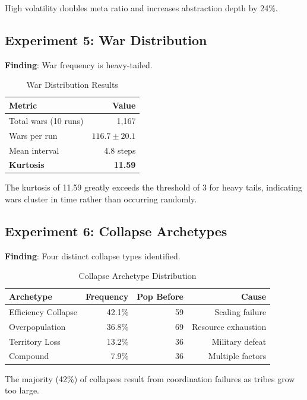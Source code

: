 \documentclass[11pt,a4paper]{article}
\begin{document}
High volatility doubles meta ratio and increases abstraction depth by 24\%.

\subsection{Experiment 5: War Distribution}

\textbf{Finding}: War frequency is heavy-tailed.

\begin{table}[htbp]
\centering
\caption{War Distribution Results}
\label{tab:wars}
\begin{tabular}{@{}lr@{}}
\toprule
Metric & Value \\
\midrule
Total wars (10 runs) & 1,167 \\
Wars per run & $116.7 \pm 20.1$ \\
Mean interval & 4.8 steps \\
\textbf{Kurtosis} & \textbf{11.59} \\
\bottomrule
\end{tabular}
\end{table}

The kurtosis of 11.59 greatly exceeds the threshold of 3 for heavy tails, indicating wars cluster in time rather than occurring randomly.

\subsection{Experiment 6: Collapse Archetypes}

\textbf{Finding}: Four distinct collapse types identified.

\begin{table}[htbp]
\centering
\caption{Collapse Archetype Distribution}
\label{tab:collapses}
\begin{tabular}{@{}lrrr@{}}
\toprule
Archetype & Frequency & Pop Before & Cause \\
\midrule
Efficiency Collapse & 42.1\% & 59 & Scaling failure \\
Overpopulation & 36.8\% & 69 & Resource exhaustion \\
Territory Loss & 13.2\% & 36 & Military defeat \\
Compound & 7.9\% & 36 & Multiple factors \\
\bottomrule
\end{tabular}
\end{table}

The majority (42\%) of collapses result from coordination failures as tribes grow too large.
\end{document}
